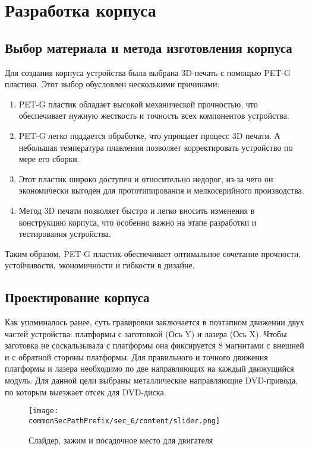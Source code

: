 \section{Разработка корпуса}
\label{sec:case}

\subsection{Выбор материала и метода изготовления корпуса}

Для создания корпуса устройства была выбрана 3D-печать с помощью PET-G пластика. Этот выбор обусловлен несколькими причинами:

\begin{enumerate}
    \item PET-G пластик обладает высокой механической прочностью, 
    что обеспечивает нужную жесткость и точность всех компонентов устройства.
    \item PET-G легко поддается обработке, что упрощает процесс 3D печати. 
    А небольшая температура плавления позволяет корректировать устройство по мере его сборки.
    \item Этот пластик широко доступен и относительно недорог, из-за чего он экономически выгоден для 
    прототипирования и мелкосерийного производства.
    \item Метод 3D печати позволяет быстро и легко вносить изменения в конструкцию корпуса, 
    что особенно важно на этапе разработки и тестирования устройства.
\end{enumerate}

Таким образом, PET-G пластик обеспечивает оптимальное сочетание прочности, устойчивости, экономичности и гибкости в дизайне.

\subsection{Проектирование корпуса}

Как упоминалось ранее, суть гравировки заключается в поэтапном движении двух частей устройства: платформы
с заготовкой (Ось Y) и лазера (Ось X). Чтобы заготовка не соскальзывала с платформы она фиксируется 8 магнитами 
с внешней и с обратной стороны платформы. Для правильного и точного движения платформы и лазера необходимо по две 
направляющих на каждый движущийся модуль. Для данной цели выбраны металлические направляющие DVD-привода, 
по которым выезжает отсек для DVD-диска. 

\begin{figure}[ht]
    \centering
    \texttt{[image: \\commonSecPathPrefix/sec\_6/content/slider.png]}
    \caption{Слайдер, зажим и посадочное место для двигателя}
    \label{fig:slider}
\end{figure}


